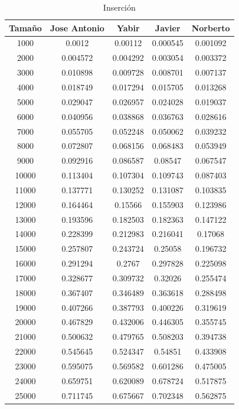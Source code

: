 \documentclass[11pt,a4paper]{article}
\begin{document}
\begin{table}[h]
	\centering
	\caption{Inserción}
	\begin{tabular}{ | c | c  | c | c | c | }
		\hline
		Tama\~no & Jose Antonio & Yabir & Javier & Norberto\\ 
		\hline
		1000	&	0.0012	&	0.00112	&	0.000545	&	0.001092	\\
		2000	&	0.004572	&	0.004292	&	0.003054	&	0.003372	\\
		3000	&	0.010898	&	0.009728	&	0.008701	&	0.007137	\\
		4000	&	0.018749	&	0.017294	&	0.015705	&	0.013268	\\
		5000	&	0.029047	&	0.026957	&	0.024028	&	0.019037	\\
		6000	&	0.040956	&	0.038868	&	0.036763	&	0.028616	\\
		7000	&	0.055705	&	0.052248	&	0.050062	&	0.039232	\\
		8000	&	0.072807	&	0.068156	&	0.068483	&	0.053949	\\
		9000	&	0.092916	&	0.086587	&	0.08547	&	0.067547	\\
		10000	&	0.113404	&	0.107304	&	0.109743	&	0.087403	\\
		11000	&	0.137771	&	0.130252	&	0.131087	&	0.103835	\\
		12000	&	0.164464	&	0.15566	&	0.155903	&	0.123986	\\
		13000	&	0.193596	&	0.182503	&	0.182363	&	0.147122	\\
		14000	&	0.228399	&	0.212983	&	0.216041	&	0.17068	\\
		15000	&	0.257807	&	0.243724	&	0.25058	&	0.196732	\\
		16000	&	0.291294	&	0.2767	&	0.297828	&	0.225098	\\
		17000	&	0.328677	&	0.309732	&	0.32026	&	0.255474	\\
		18000	&	0.367407	&	0.346489	&	0.363618	&	0.288498	\\
		19000	&	0.407266	&	0.387793	&	0.400226	&	0.319619	\\
		20000	&	0.467829	&	0.432006	&	0.446305	&	0.355745	\\
		21000	&	0.500632	&	0.479765	&	0.508203	&	0.394738	\\
		22000	&	0.545645	&	0.524347	&	0.54851	&	0.433908	\\
		23000	&	0.595075	&	0.569582	&	0.601286	&	0.475005	\\
		24000	&	0.659751	&	0.620089	&	0.678724	&	0.517875	\\
		25000	&	0.711745	&	0.675667	&	0.702348	&	0.562875	\\
		\hline
	\end{tabular}
\end{table}
\end{document}
